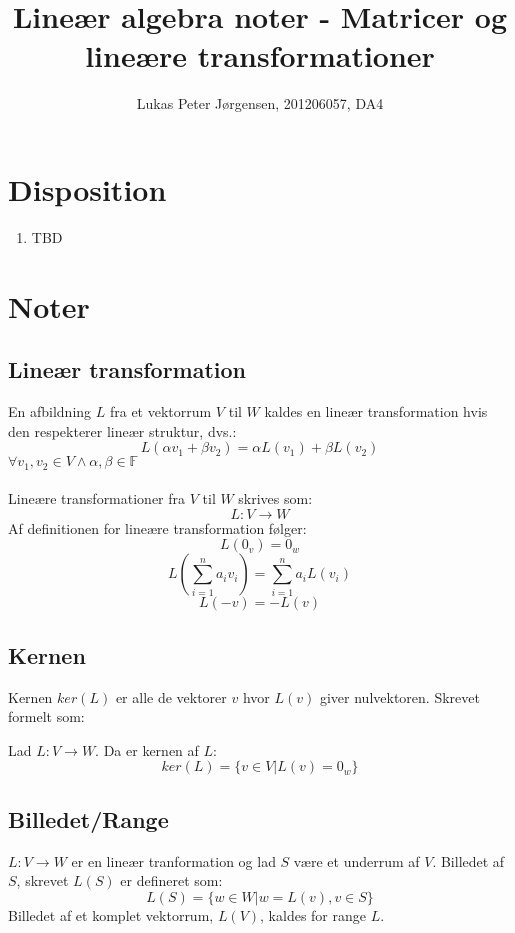 \documentclass[a4paper,oneside,article]{memoir}
\begin{document}
    \title{Lineær algebra noter - Matricer og lineære transformationer}
    \author{Lukas Peter Jørgensen, 201206057, DA4
            }
    \maketitle
        	
    \tableofcontents
        
    \chapter{Disposition}
    \begin{enumerate}
    	\item TBD
    \end{enumerate}
    
	\chapter{Noter}
	
	\section{Lineær transformation}
	En afbildning $L$ fra et vektorrum $V$ til $W$ kaldes en lineær
	transformation hvis den respekterer lineær struktur, dvs.:
	$$L(\alpha v_1 + \beta v_2) = \alpha L(v_1) + \beta L(v_2)$$
	$\forall v_1,v_2\in V \wedge \alpha,\beta \in \mathbb{F}$\\
    \\
    Lineære transformationer fra $V$ til $W$ skrives som:
    $$L:V\rightarrow W$$
    Af definitionen for lineære transformation følger:
    $$L(0_v)=0_w$$
    $$L(\sum\limits_{i=1}^{n}a_iv_i) = \sum\limits_{i=1}^{n}a_iL(v_i)$$
    $$L(-v)=-L(v)$$
    
    \section{Kernen}
    Kernen $ker(L)$ er alle de vektorer $v$ hvor $L(v)$ giver nulvektoren. 
    Skrevet formelt som:
    
    Lad $L:V\rightarrow W$. Da er kernen af $L$:
    $$ker(L)=\{v\in V|L(v)=0_w \}$$
    
    \section{Billedet/Range}
    $L:V\rightarrow W$ er en lineær tranformation og lad $S$ være et
    underrum af $V$. Billedet af $S$, skrevet $L(S)$ er defineret som:
    $$L(S)=\{w\in W|w=L(v), v\in S \}$$
    Billedet af et komplet vektorrum, $L(V)$, kaldes for range $L$.
    
\end{document}
